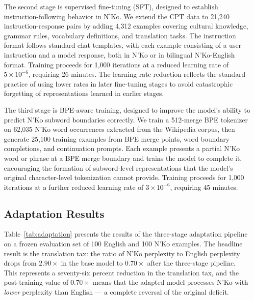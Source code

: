 \documentclass[11pt]{article}
\newcommand{\nko}{N'Ko}
\begin{document}
The second stage is supervised fine-tuning (SFT), designed to establish instruction-following behavior in \nko{}. We extend the CPT data to 21,240 instruction-response pairs by adding 4,312 examples covering cultural knowledge, grammar rules, vocabulary definitions, and translation tasks. The instruction format follows standard chat templates, with each example consisting of a user instruction and a model response, both in \nko{} or in bilingual \nko{}-English format. Training proceeds for 1,000 iterations at a reduced learning rate of $5 \times 10^{-6}$, requiring 26 minutes. The learning rate reduction reflects the standard practice of using lower rates in later fine-tuning stages to avoid catastrophic forgetting of representations learned in earlier stages.

The third stage is BPE-aware training, designed to improve the model's ability to predict \nko{} subword boundaries correctly. We train a 512-merge BPE tokenizer on 62,035 \nko{} word occurrences extracted from the Wikipedia corpus, then generate 25,100 training examples from BPE merge points, word boundary completions, and continuation prompts. Each example presents a partial \nko{} word or phrase at a BPE merge boundary and trains the model to complete it, encouraging the formation of subword-level representations that the model's original character-level tokenization cannot provide. Training proceeds for 1,000 iterations at a further reduced learning rate of $3 \times 10^{-6}$, requiring 45 minutes.

\subsection{Adaptation Results}
\label{sec:adaptation_results}

Table~\ref{tab:adaptation} presents the results of the three-stage adaptation pipeline on a frozen evaluation set of 100 English and 100 \nko{} examples. The headline result is the translation tax: the ratio of \nko{} perplexity to English perplexity drops from $2.90\times$ in the base model to $0.70\times$ after the three-stage pipeline. This represents a seventy-six percent reduction in the translation tax, and the post-training value of $0.70\times$ means that the adapted model processes \nko{} with \emph{lower} perplexity than English --- a complete reversal of the original deficit.
\end{document}
